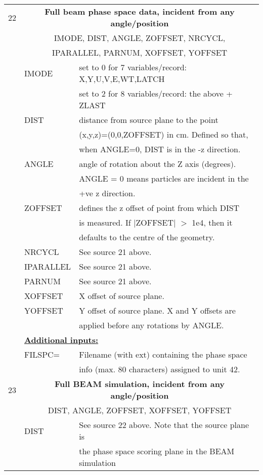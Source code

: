 \begin{longtable}{lll}
\hline
22&\multicolumn{2}{c}{\bf Full beam phase space data, incident from any angle/position}\\
  &\multicolumn{2}{c}{IMODE, DIST, ANGLE, ZOFFSET, NRCYCL,}\\
  &\multicolumn{2}{c}{IPARALLEL, PARNUM, XOFFSET, YOFFSET}\\
  & IMODE & set to 0 for 7 variables/record: X,Y,U,V,E,WT,LATCH \\
  &  & set to 2 for 8 variables/record: the above + ZLAST \\
  & DIST & distance from source plane to the point\\
  &      & (x,y,z)=(0,0,ZOFFSET) in cm.  Defined so that,\\
  &      &  when ANGLE=0, DIST is in the -z direction.\\
  & ANGLE & angle of rotation about the Z axis (degrees).  \\
  &       &  ANGLE = 0 means particles are incident in the \\
  &       & +ve z direction.\\
  & ZOFFSET & defines the z offset of point from which DIST\\
  &         &  is measured. If $|$ZOFFSET$|$ $>$ 1e4, then it\\
  &         & defaults to the centre of the geometry.\\
  & NRCYCL & See source 21 above.\\
  & IPARALLEL & See source 21 above.\\
  & PARNUM & See source 21 above.\\
  & XOFFSET & X offset of source plane.\\
  & YOFFSET & Y offset of source plane.  X and Y offsets are\\
  &         & applied before any rotations by ANGLE.\\
& \multicolumn{2}{l}{\bf \underline {Additional inputs:}}\\
  & FILSPC=  & Filename (with ext) containing the phase space\\
  &         & info (max. 80 characters) assigned  to unit 42.\\
\hline
23&\multicolumn{2}{c}{\bf Full BEAM simulation, incident from any angle/position}\\
  &\multicolumn{2}{c}{DIST, ANGLE, ZOFFSET, XOFFSET, YOFFSET}\\
  & DIST & See source 22 above.  Note that the source plane is\\
  &      & the phase space scoring plane in the BEAM simulation\\

\end{longtable}
